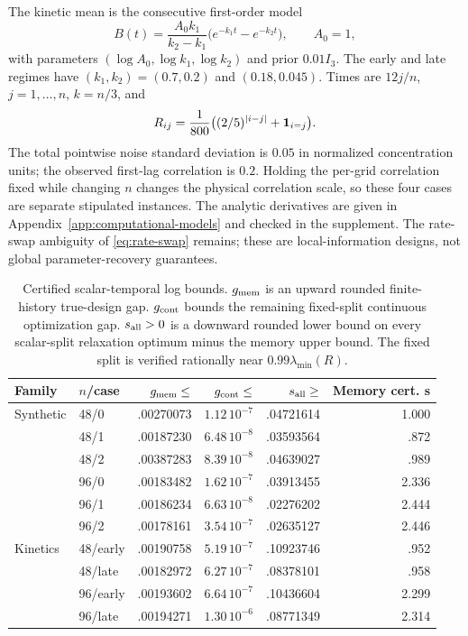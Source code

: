 The kinetic mean is the consecutive first-order model
\begin{equation}\label{eq:computational-kinetics}
 B(t)=\frac{A_0k_1}{k_2-k_1}
       \bigl(e^{-k_1t}-e^{-k_2t}\bigr),\qquad A_0=1,
\end{equation}
with parameters $(\log A_0,\log k_1,\log k_2)$ and prior $0.01I_3$.
The early and late regimes have $(k_1,k_2)=(0.7,0.2)$ and $(0.18,0.045)$.
Times are $12j/n$, $j=1,\ldots,n$, $k=n/3$, and
\begin{equation}\label{eq:temporal-probe-covariance}
 R_{ij}=\frac1{800}\bigl((2/5)^{|i-j|}+\mathbf 1_{i=j}\bigr).
\end{equation}
The total pointwise noise standard deviation is $0.05$ in normalized
concentration units; the observed first-lag correlation is $0.2$.
Holding the per-grid correlation fixed while changing $n$ changes the physical
correlation scale, so these four cases are separate stipulated instances.
The analytic derivatives are given in Appendix~\ref{app:computational-models}
and checked in the supplement. The rate-swap ambiguity of
\eqref{eq:rate-swap} remains; these are local-information designs, not global
parameter-recovery guarantees.

\begin{table}[htbp]
\centering\small
\caption{Certified scalar-temporal log bounds. $g_{\rm mem}$ is an upward
rounded finite-history true-design gap. $g_{\rm cont}$ bounds the remaining
fixed-split continuous optimization gap. $s_{\rm all}>0$ is a downward rounded
lower bound on every scalar-split relaxation optimum minus the memory upper
bound. The fixed split is verified rationally near $0.99\lambda_{\min}(R)$.}
\label{tab:scalar-separations}
\begin{tabular}{llrrrr}
\toprule
Family & $n$/case & $g_{\rm mem}\le$ & $g_{\rm cont}\le$ & $s_{\rm all}\ge$ & Memory cert. s\\
\midrule
Synthetic & 48/0 & .00270073 & $1.12\,10^{-7}$ & .04721614 & 1.000\\
&48/1 & .00187230 & $6.48\,10^{-8}$ & .03593564 & .872\\
&48/2 & .00387283 & $8.39\,10^{-8}$ & .04639027 & .989\\
&96/0 & .00183482 & $1.62\,10^{-7}$ & .03913455 & 2.336\\
&96/1 & .00186234 & $6.63\,10^{-8}$ & .02276202 & 2.444\\
&96/2 & .00178161 & $3.54\,10^{-7}$ & .02635127 & 2.446\\
\midrule
Kinetics & 48/early & .00190758 & $5.19\,10^{-7}$ & .10923746 & .952\\
&48/late & .00182972 & $6.27\,10^{-7}$ & .08378101 & .958\\
&96/early & .00193602 & $6.64\,10^{-7}$ & .10436604 & 2.299\\
&96/late & .00194271 & $1.30\,10^{-6}$ & .08771349 & 2.314\\
\bottomrule
\end{tabular}
\end{table}

